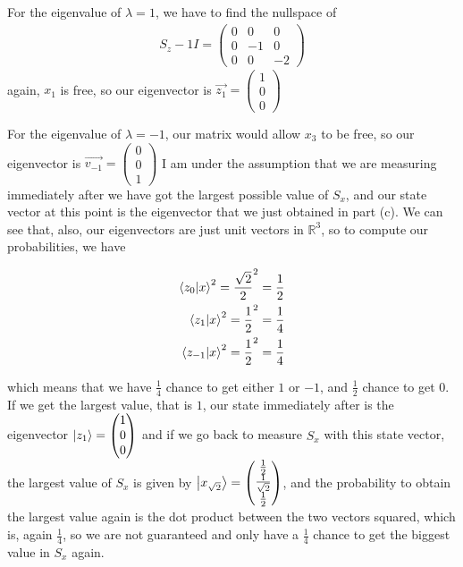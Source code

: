 \documentclass{article}
\begin{document}
For the eigenvalue of $\lambda = 1$, we have to find the nullspace of 
\begin{align}
    S_z - 1I= \begin{pmatrix}
        0 & 0 & 0 \\ 0 & -1 & 0 \\  0 & 0 & -2
    \end{pmatrix}
\end{align}
again, $x_1$ is free, so our eigenvector is $\Vec{z_1} = \begin{pmatrix}
    1 \\ 0 \\ 0
\end{pmatrix}$

For the eigenvalue of $\lambda = -1$, our matrix would allow $x_3$ to be free, so our eigenvector is $\Vec{v_{-1}} = \begin{pmatrix}
    0 \\ 0 \\ 1
\end{pmatrix}$
I am under the assumption that we are measuring immediately after we have got the largest possible value of $S_x$, and our state vector at this point is the eigenvector that we just obtained in part (c). We can see that, also, our eigenvectors are just unit vectors in $\mathbb{R}^3$, so to compute our probabilities, we have

\begin{align}
    \bra{z_0} \ket{x}^2 = \frac{\sqrt{2}}{2}^2 = \frac{1}{2} \\
    \bra{z_1} \ket{x}^2= \frac{1}{2}^2 = \frac{1}{4} \\
    \bra{z_{-1}} \ket{x}^2 = \frac{1}{2}^2 = \frac{1}{4}
\end{align}

which means that we have $\frac{1}{4}$ chance to get either $1$ or $-1$, and $\frac{1}{2}$ chance to get $0$. If we get the largest value, that is $1$, our state immediately after is the eigenvector $\ket{z_1} = \begin{pmatrix}
    1 \\ 0 \\ 0
\end{pmatrix}$
and if we go back to measure $S_x$ with this state vector, the largest value of $S_x$ is given by $\ket{x_{\sqrt{2}}} = \begin{pmatrix}
    \frac{1}{2} \\ \frac{1}{\sqrt{2}} \\ \frac{1}{2}
\end{pmatrix}$, and the probability to obtain the largest value again is the dot product between the two vectors squared, which is, again $\frac{1}{4}$, so we are not guaranteed and only have a $\frac{1}{4}$ chance to get the biggest value in $S_x$ again.
\end{document}
